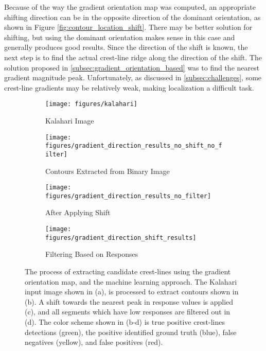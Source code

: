 Because of the way the gradient orientation map was computed, an appropriate shifting direction can be in the opposite direction of the dominant orientation, as shown in Figure \ref{fig:contour_location_shift}. There may be better solution for shifting, but using the dominant orientation makes sense in this case and generally produces good results. Since the direction of the shift is known, the next step is to find the actual crest-line ridge along the direction of the shift. The solution proposed in \ref{subsec:gradient_orientation_based} was to find the nearest gradient magnitude peak. Unfortunately, as discussed in \ref{subsec:challenges}, some crest-line gradients may be relatively weak, making localization a difficult task.

\begin{figure}
	\centering
	\begin{subfigure}{0.48\textwidth}
		\centering
		\texttt{[image: figures/kalahari]}
		\caption{Kalahari Image}
		\label{fig:kalahari_image_2}
	\end{subfigure}
	\begin{subfigure}{0.48\textwidth}
		\centering
		\texttt{[image: figures/gradient\_direction\_results\_no\_shift\_no\_filter]}
		\caption{Contours Extracted from Binary Image}
		\label{fig:gradient_direction_results_no_shift_no_filter}
	\end{subfigure}
	\begin{subfigure}{0.48\textwidth}
		\centering
		\texttt{[image: figures/gradient\_direction\_results\_no\_filter]}
		\caption{ After Applying Shift }
		\label{fig:gradient_direction_results_no_filter}
	\end{subfigure}
	\begin{subfigure}{0.48\textwidth}
		\centering
		\texttt{[image: figures/gradient\_direction\_shift\_results]}
		\caption{ Filtering Based on Responses }
		\label{fig:gradient_direction_shift_results}
	\end{subfigure}
	\caption{ The process of extracting candidate crest-lines using the gradient orientation map, and the machine learning approach. The Kalahari input image shown in (a), is processed to extract contours shown in (b). A shift towards the nearest peak in response values is applied (c), and all segments which have low responses are filtered out in (d). The color scheme shown in (b-d) is true positive crest-lines detections (green), the positive identified ground truth (blue), false negatives (yellow), and false positives (red).}
	\label{fig:shifting_contours_results}
\end{figure}

